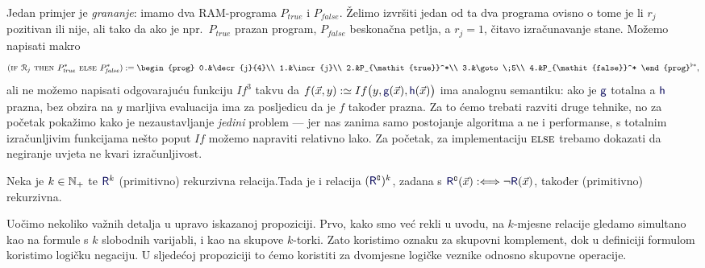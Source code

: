Jedan primjer je \emph{grananje}: imamo dva RAM-programa $P_{\mathit{true}}$ i $P_{\mathit{false}}$. Želimo izvršiti jedan od ta dva programa ovisno o tome je li $r_j$ pozitivan ili nije, ali tako da ako je npr.\ $P_{\mathit{true}}$ prazan program, $P_{\mathit{false}}$ beskonačna petlja, a $r_j=1$, čitavo izračunavanje stane. Možemo napisati makro
\vspace{-2mm}
\begin{equation}
    (\textsc{if $\reg{j}$ then $P_{\mathit{true}}^*$ else $P_{\mathit{false}}^*$}):=\begin{prog}
    0.&\decr{j}{4}\\
    1.&\incr{j}\\
    2.&P_{\mathit{true}}^*\\
    3.&\goto\;5\\
    4.&P_{\mathit{false}}^*
    \end{prog}^{\flat*}\text,
\end{equation}
ali ne možemo napisati odgovarajuću funkciju $If^3$ takvu da $f(\vec x,y):\simeq If\bigl(y,\f g(\vec x),\f h(\vec x)\bigr)$ ima analognu semantiku: ako je $\f g$ totalna a $\f h$ prazna, bez obzira na $y$ marljiva evaluacija ima za posljedicu da je $f$ također prazna. Za to ćemo trebati razviti druge tehnike, no za početak pokažimo kako je nezaustavljanje \emph{jedini} problem --- jer nas zanima samo postojanje algoritma a ne i performanse, s totalnim izračunljivim funkcijama nešto poput $If$ možemo napraviti relativno lako. 
 Za početak, za implementaciju $\textsc{else}$ trebamo dokazati da negiranje uvjeta ne kvari izračunljivost.%

\begin{propozicija}[{name=[komplement čuva (primitivnu) rekurzivnost]}]\label{prop:kompl}
Neka je $k\in{\mathbb N}_+$ te $\f R^k$ (primitivno) rekurzivna relacija.\newline Tada je i relacija $(\f R\kompl)^k$, zadana s $\f R\kompl(\vec x):\Longleftrightarrow\lnot \f R(\vec x)$, također (primitivno) rekurzivna.
\end{propozicija}

Uočimo nekoliko važnih detalja u upravo iskazanoj propoziciji. Prvo, kako smo već rekli u uvodu, na $k$-mjesne relacije gledamo simultano kao na formule s $k$ slobodnih varijabli, i kao na skupove $k$-torki. Zato koristimo oznaku za skupovni komplement, dok u definiciji formulom koristimo logičku negaciju. U sljedećoj propoziciji to ćemo koristiti za dvomjesne logičke veznike odnosno skupovne operacije.

